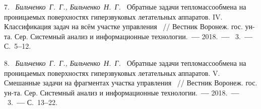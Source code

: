 7.~%
\textit%
{Бильченко~Г.~Г.,
 Бильченко~Н.~Г.~}
{%
  {Обратные  задачи  тепломассообмена
   на  проницаемых  поверхностях
   гиперзвуковых  летательных  аппаратов.
  IV.  Классификация  задач
   на  всём  участке  управления}%
~/$\!$/
  Вестник  Воронеж.  гос.  ун-та.
  Сер.  Системный  анализ
  и  информационные  технологии.~{\textbf{---}}
  2018.~{\textbf{---}}
  \No~3.~{\textbf{---}}
  С.~5{\textbf{--}}12.%
  }



8.~%
\textit%
{Бильченко~Г.~Г.,
 Бильченко~Н.~Г.~}
{%
  {Обратные  задачи  тепломассообмена
   на  проницаемых  поверхностях
   гиперзвуковых  летательных  аппаратов.
   V.  Смешанные  задачи
   на  фрагментах  участка  управления}%
~/$\!$/
  Вестник  Воронеж.  гос.  ун-та.
  Сер.  Системный  анализ
  и  информационные  технологии.~{\textbf{---}}
  2018.~{\textbf{---}}
  \No~3.~{\textbf{---}}
  С.~13{\textbf{--}}22.%
  }



